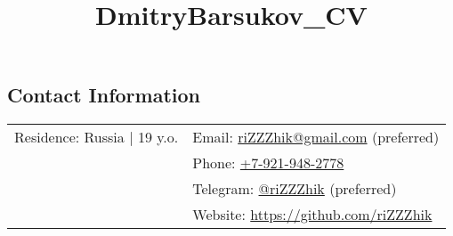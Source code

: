 \documentclass[margin,line]{res}
\begin{document}
\title{DmitryBarsukov_CV}

\begin{resume}

\section{\sc Contact Information}

\vspace{.05in}
\begin{tabular}{@{}p{2.30in}p{3in}}
Residence: Russia {|} 19 y.o.
& Email: \href{mailto:riZZZhik@gmail.com}{riZZZhik@gmail.com} (preferred) \\
& Phone: \href{tel:+79219482778}{+7-921-948-2778} \\
& Telegram: \href{https://t.me/riZZZhik}{@riZZZhik} (preferred) \\
& Website: \href{https://github.com/riZZZhik}{https://github.com/riZZZhik} \\
\end{tabular}



\newpage


\end{resume}
\end{document}
